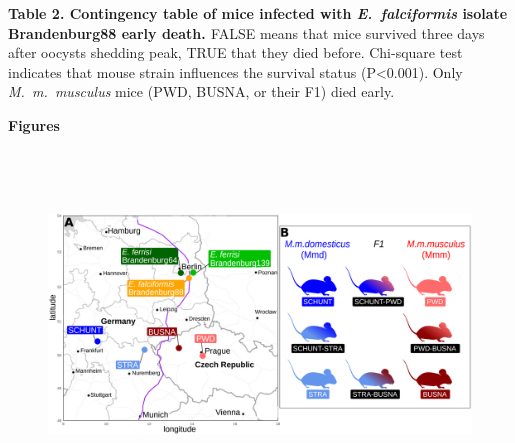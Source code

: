 \documentclass[12pt]{article}
\renewcommand{\_}{\kern-1.5pt\textunderscore\kern-1.5pt}
\begin{document}

\par

{\fontsize{10pt}{12.0pt}\selectfont \textbf{\textcolor[HTML]{FF0000}{Table 2. Contingency table of mice infected with \textit{E. falciformis} isolate Brandenburg88 early death. }}\textcolor[HTML]{FF0000}{FALSE means that mice survived three days after oocysts shedding peak, TRUE that they died before. Chi-square test indicates that mouse strain influences the survival status (P<0.001). Only \textit{M. m. musculus} mice (PWD, BUSNA, or their F1) died early.}\par}


\newpage
\par

\begin{FlushLeft}
{\fontsize{14pt}{16.8pt}\selectfont \textbf{Figures}\par}
\end{FlushLeft}\par




\begin{figure}[H]
	\begin{Center}
		\includegraphics[width=6.92in,height=3.63in]{./media/image3.png}
	\end{Center}
\end{figure}


\end{document}

